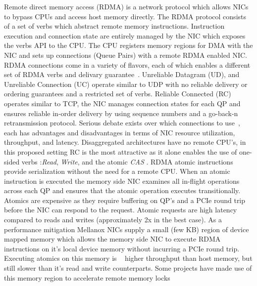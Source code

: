 Remote direct memory access (RDMA) is a network protocol
which allows NICs to bypass CPUs and access host memory
directly.  The RDMA protocol consists of a set of verbs
which abstract remote memory instructions. Instruction
execution and connection state are entirely managed by the
NIC which exposes the verbs API to the CPU. The CPU
registers memory regions for DMA with the NIC and sets up
connections (Queue Pairs) with a remote RDMA enabled NIC.
RDMA connections come in a variety of flavors, each of which
enables a different set of RDMA verbs and delivary
guarantee~\cite{herd, erpc, storm}. Unreliable Datagram
(UD), and Unreliable Connection (UC) operate similar to UDP
with no reliable delivery or ordering guarantees and a
restricted set of verbs.  Reliable Connected (RC) operates
similar to TCP, the NIC manages connection states for each
QP and ensures reliable in-order delivery by using sequence
numbers and a go-back-n retransmission protocol.
Serious debate exists over which connections to
use~\cite{storm,cell,herd,faast,farm}, each has advantages
and disadvantages in terms of NIC resource utilization,
throughput, and latency. Disaggregated architectures have no
remote CPU's, in this proposed setting RC is the most
attractive as it alone enables the use of one-sided verbs
:\textit{Read}, \textit{Write}, and the atomic \textit{CAS}
.
RDMA atomic instructions provide serialization without the
need for a remote CPU. When an atomic instruction is
executed the memory side NIC examines all in-flight
operations across each QP and ensures that the atomic
operation executes transitionally. Atomics are expensive as
they require buffering on QP's and a PCIe round trip before
the NIC can respond to the request.  Atomic requests are
high latency compared to reads and writes (approximately 2x
in the best case). As a performance mitigation Mellanox NICs
supply a small (few KB) region of device mapped memory which
allows the memory side NIC to execute RDMA instructions on
it's local device memory without incurring a PCIe round
trip. Executing atomics on this memory is ~ higher
throughput than host memory, but still slower than it's read
and write counterparts. Some projects have made use of this
memory region to accelerate remote memory
locks~\cite{sherman}




